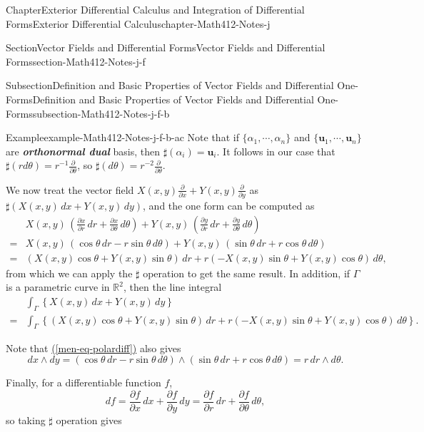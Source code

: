 \documentclass[oneside,10pt,]{book}
\newcommand{\xreffont}{\relax}
\newcommand{\alert}[1]{\textbf{\textit{#1}}}
\numberwithin{equation}{section}
\newcommand{\bu}{\mathbf{u}}
\newcommand{\bbR}{\mathbb{R}}
\newcommand{\amp}{&}
\begin{document}
\begin{chapterptx}{Chapter}{Exterior Differential Calculus and Integration of Differential Forms}{}{Exterior Differential Calculus}{}{}{chapter-Math412-Notes-j}
\begin{sectionptx}{Section}{Vector Fields and Differential Forms}{}{Vector Fields and Differential Forms}{}{}{section-Math412-Notes-j-f}
\begin{subsectionptx}{Subsection}{Definition and Basic Properties of Vector Fields and Differential One-Forms}{}{Definition and Basic Properties of Vector Fields and Differential One-Forms}{}{}{subsection-Math412-Notes-j-f-b}
\begin{example}{Example}{}{example-Math412-Notes-j-f-b-ac}
Note that if \(\{\alpha_{1},\cdots, \alpha_{n}\}\) and \(\{\bu_{1},\cdots, \bu_{n}\}\) are \alert{orthonormal dual} basis, then \(\sharp (\alpha_{i})=\bu_{i}\). It follows in our case that \(\sharp (r d\theta)=r^{-1} \frac{\partial }{\partial \theta}\), so \(\sharp (d\theta)=r^{-2} \frac{\partial}{\partial \theta}\).%
\par
We now treat the vector field \(X(x,y) \frac{\partial }{\partial x} + Y(x, y) \frac{\partial }{\partial y}\) as  \(\sharp (X(x,y)\, dx + Y(x,y)\, dy)\), and the one form can be computed as%
\begin{align*}
\amp
X(x,y)\,\left(\frac{\partial x}{\partial r}\, dr + \frac{\partial x}{\partial \theta}\, d\theta \right)
+ Y(x, y)\, \left(\frac{\partial y}{\partial r}\, dr + \frac{\partial y}{\partial \theta}\, d\theta \right)\\
=\amp X(x,y)\,\left( \cos \theta \, dr- r\sin\theta\, d\theta \right)
+ Y(x, y)\, \left( \sin\theta\, dr + r\cos\theta\, d\theta \right)\\
=\amp \left( X(x,y) \cos \theta + Y(x, y) \sin\theta \right)\,dr + 
r \left( -X(x,y) \sin \theta + Y(x, y) \cos\theta \right)\,d\theta, 
\end{align*}
from which we can apply the \(\sharp\) operation to get the same result. In addition, if \(\Gamma\) is a parametric curve in \(\bbR^{2}\), then the line integral%
\begin{align*}
\amp \int_{\Gamma} \left\{ X(x,y)\, dx + Y(x,y)\, dy \right\} \\
=\amp \int_{\Gamma}\left\{ \left( X(x,y) \cos \theta + Y(x, y) \sin\theta \right)\,dr + 
r \left( -X(x,y) \sin \theta + Y(x, y) \cos\theta \right)\,d\theta \right\}.
\end{align*}
%
\par
Note that \hyperref[men-eq-polardiff]{({\xreffont\ref{men-eq-polardiff}})} also gives%
\begin{equation*}
dx\wedge dy =\left( \cos \theta \, dr- r\sin\theta\, d\theta\right)\wedge\left( \sin\theta\, dr + r\cos\theta\, d\theta\right) = r \, dr\wedge d\theta.
\end{equation*}
%
\par
Finally, for a differentiable function \(f\),%
\begin{equation*}
df=\frac{\partial f}{\partial x}\, dx + \frac{\partial f}{\partial y}\, dy
=\frac{\partial f}{\partial r}\, dr + \frac{\partial f}{\partial \theta}\, d\theta,
\end{equation*}
so taking \(\sharp\) operation  gives%
\begin{equation*}

\end{equation*}
\end{example}
\end{subsectionptx}
\end{sectionptx}
\end{chapterptx}
\end{document}
